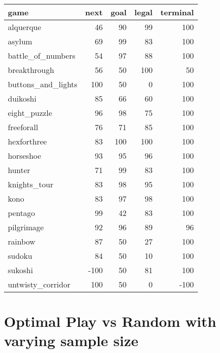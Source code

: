 \documentclass[a4paper,12pt]{report}
\begin{document}
\begin{tabular}{lrrrr}
\hline
 game               &   next &   goal &   legal &   terminal \\
\hline
 alquerque          &     46 &     90 &      99 &        100 \\
 asylum             &     69 &     99 &      83 &        100 \\
 battle\_of\_numbers  &     54 &     97 &      88 &        100 \\
 breakthrough       &     56 &     50 &     100 &         50 \\
 buttons\_and\_lights &    100 &     50 &       0 &        100 \\
 duikoshi           &     85 &     66 &      60 &        100 \\
 eight\_puzzle       &     96 &     98 &      75 &        100 \\
 freeforall         &     76 &     71 &      85 &        100 \\
 hexforthree        &     83 &    100 &     100 &        100 \\
 horseshoe          &     93 &     95 &      96 &        100 \\
 hunter             &     71 &     99 &      83 &        100 \\
 knights\_tour       &     83 &     98 &      95 &        100 \\
 kono               &     83 &     97 &      98 &        100 \\
 pentago            &     99 &     42 &      83 &        100 \\
 pilgrimage         &     92 &     96 &      89 &         96 \\
 rainbow            &     87 &     50 &      27 &        100 \\
 sudoku             &     84 &     50 &      10 &        100 \\
 sukoshi            &   -100 &     50 &      81 &        100 \\
 untwisty\_corridor  &    100 &     50 &       0 &       -100 \\
\hline
\end{tabular}



\section{Optimal Play vs Random with varying sample size}


\end{document}

